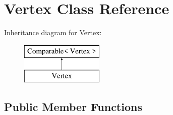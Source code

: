 \hypertarget{class_vertex}{\section{Vertex Class Reference}
\label{class_vertex}
}
Inheritance diagram for Vertex\+:\begin{figure}[H]
\begin{center}
\leavevmode
\includegraphics[height=2.000000cm]{class_vertex}
\end{center}
\end{figure}
\subsection*{Public Member Functions}
